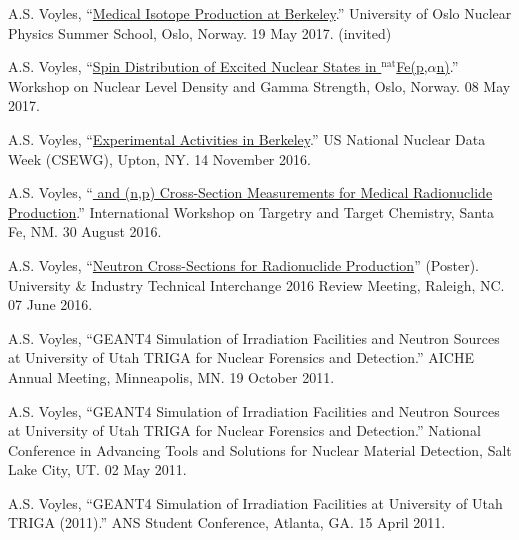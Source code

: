 \begin{bibsection}
\item A.S. Voyles, \enquote{\href{https://github.com/avoyles/presentations/blob/master/2017-05-19-oslo_summer_school/Voyles_19_May_2017_Oslo_Summer_School.pdf}{Medical Isotope Production at Berkeley}.} University of Oslo Nuclear Physics Summer School, Oslo, Norway.  19 May 2017. (invited)

\item A.S. Voyles, \enquote{\href{http://tid.uio.no/workshop2017/talks/OsloWS17_Voyles.pdf}{Spin Distribution of Excited Nuclear States in $^{\text{nat}}$Fe(p,$\alpha$n)}.}  Workshop on Nuclear Level Density and Gamma Strength, Oslo, Norway. 08 May 2017.


\item A.S. Voyles, \enquote{\href{https://indico.bnl.gov/event/1743/contributions/3189/}{Experimental Activities in Berkeley}.} US National Nuclear Data Week  (CSEWG), Upton, NY. 14 November 2016.


\item A.S. Voyles, \enquote{\href{https://slideslive.com/38898186/64cu-and-47scnp-crosssection-measurements-for-medical-radionuclide-production}{ and  (n,p) Cross-Section Measurements for Medical Radionuclide Production}.}  International Workshop on Targetry and Target Chemistry, Santa Fe, NM. 30 August 2016.

\item A.S. Voyles, \enquote{\href{https://github.com/avoyles/posters/blob/master/2016-06-07-UITI/Voyles_UITI2016_Poster_OsloUpdate.pdf}{Neutron Cross-Sections for Radionuclide Production}} (Poster).  University \& Industry Technical Interchange 2016 Review Meeting, Raleigh, NC. 07 June 2016.

\item A.S. Voyles, \enquote{GEANT4 Simulation of Irradiation Facilities and Neutron Sources at University of Utah TRIGA for
Nuclear Forensics and Detection.}  AICHE Annual Meeting, Minneapolis, MN. 19 October 2011.

\item A.S. Voyles, \enquote{GEANT4 Simulation of Irradiation Facilities and Neutron Sources at University of Utah TRIGA for
Nuclear Forensics and Detection.}   National Conference in Advancing Tools and Solutions for
Nuclear Material Detection, Salt Lake City, UT. 02 May 2011.

\item A.S. Voyles, \enquote{GEANT4 Simulation of Irradiation Facilities at University of Utah TRIGA (2011).} 
ANS Student Conference, Atlanta, GA. 15 April 2011.

\end{bibsection}


